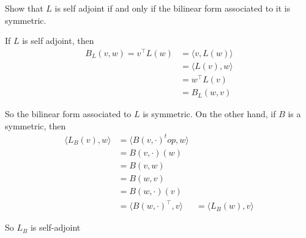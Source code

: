 \documentclass{ximera}
\begin{document}
	Show that $L$ is self adjoint if and only if the bilinear form associated to it is symmetric.
\begin{free-response}
	If $L$ is self adjoint, then 
	\begin{align*}
	B_L(v,w) = v^\top L(w) &= \langle v , L(w)\rangle\\
		&= \langle L(v), w \rangle\\
		&= w^\top L(v)\\
		&=B_L(w,v)
	\end{align*}
	
	So the bilinear form associated to $L$ is symmetric.  On the other hand, if $B$ is a symmetric, then
		\begin{align*}
		\langle L_B(v) , w \rangle &= \langle  B(v,\cdot)^top, w\rangle\\
			&= B(v,\cdot)(w)\\
			&=B(v,w)\\
			&=B(w,v)\\
			&=B(w,\cdot)(v)\\
			&=\langle B(w,\cdot)^\top , v \rangle
			&=\langle L_B(w), v\rangle
		\end{align*}
		
		So $L_B$ is self-adjoint
\end{free-response}
	
\end{document}
